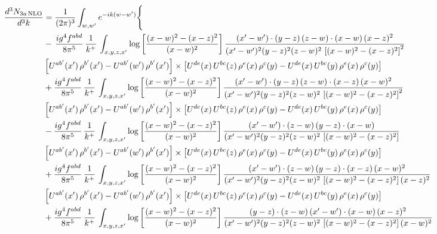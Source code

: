 \documentclass[9pt]{article}
\numberwithin{equation}{section}
\begin{document}
\begin{align}
\frac{d^{3}N_{3a\,\rm NLO}}{d^{3}k} & = \frac{1}{(2\pi)^{3}}\int_{w,w'}e^{-ik(w-w')}\Bigg\{\notag \\
& -\,\frac{ig^{4}f^{abd}}{8\pi^{5}}\,\frac{1}{k^{+}}\,\int_{x,y,z,x'}\log{\left[\frac{(x-w)^{2}-(x-z)^{2}}{(x-w)^{2}}\right]}\,
\frac{(x'-w')\cdot(y-z)\,(z-w)\cdot(x-w)\,(x-z)^{2}}{(x'-w')^{2}(y-z)^{2}(z-w)^{2}\,\left[(x-w)^{2}-(x-z)^{2}\right]^{2}}\notag \\ & \left[U^{ab'}(x')\,\rho^{b'}(x')-U^{ab'}(w')\, \rho^{b'}(x')\right]\times \left[U^{de}(x)\,U^{bc}(z)\, \rho^{e}(x)\,\rho^{c}(y)-U^{de}(x)\,U^{bc}(y)\,\rho^{e}(x)\,\rho^{c}(y)\right] \notag \\
& +\frac{ig^{4}f^{abd}}{8\pi^{5}}\,\frac{1}{k^{+}}\,\int_{x,y,z,x'}\log{\left[\frac{(x-w)^{2}-(x-z)^{2}}{(x-w)^{2}}\right]}\,
\frac{(x'-w')\cdot(y-z)\,(z-w)\cdot(x-z)\,(x-w)^{2}}{(x'-w')^{2}(y-z)^{2}(z-w)^{2}\,\left[(x-w)^{2}-(x-z)^{2}\right]^{2}}\notag \\ 
&\left[U^{ab'}(x')\,\rho^{b'}(x')-U^{ab'}(w')\, \rho^{b'}(x')\right]\times \left[U^{de}(x)\,U^{bc}(z)\, \rho^{e}(x)\,\rho^{c}(y)-U^{de}(x)\,U^{bc}(y)\,\rho^{e}(x)\,\rho^{c}(y)\right] \notag \\
& -\frac{ig^{4}f^{abd}}{8\pi^{5}}\,\frac{1}{k^{+}}\,\int_{x,y,z,x'}\log{\left[\frac{(x-w)^{2}-(x-z)^{2}}{(x-w)^{2}}\right]}\,
\frac{(x'-w')\cdot(z-w)\,(y-z)\cdot(x-w)}{(x'-w')^{2}(y-z)^{2}(z-w)^{2}\,\left[(x-w)^{2}-(x-z)^{2}\right]}\notag \\ & \left[U^{ab'}(x')\,\rho^{b'}(x')-U^{ab'}(w')\, \rho^{b'}(x')\right]\times \left[U^{de}(x)\,U^{bc}(z)\, \rho^{e}(x)\,\rho^{c}(y)-U^{de}(x)\,U^{bc}(y)\,\rho^{e}(x)\,\rho^{c}(y)\right] \notag \\
&  +\frac{ig^{4}f^{abd}}{8\pi^{5}}\,\frac{1}{k^{+}}\,\int_{x,y,z,x'}\log{\left[\frac{(x-w)^{2}-(x-z)^{2}}{(x-w)^{2}}\right]}\,
\frac{(x'-w')\cdot(z-w)\,(y-z)\cdot(x-z)\,(x-w)^{2}}{(x'-w')^{2}(y-z)^{2}(z-w)^{2}\,\left[(x-w)^{2}-(x-z)^{2}\right](x-z)^{2}}\notag \\ & \left[U^{ab'}(x')\,\rho^{b'}(x')-U^{ab'}(w')\, \rho^{b'}(x')\right]\times \left[U^{de}(x)\,U^{bc}(z)\, \rho^{e}(x)\,\rho^{c}(y)-U^{de}(x)\,U^{bc}(y)\,\rho^{e}(x)\,\rho^{c}(y)\right] \notag \\
& +\frac{ig^{4}f^{abd}}{8\pi^{5}}\,\frac{1}{k^{+}}\,\int_{x,y,z,x'}\log{\left[\frac{(x-w)^{2}-(x-z)^{2}}{(x-w)^{2}}\right]}\,
\frac{(y-z)\cdot(z-w)\,(x'-w')\cdot(x-w)\,(x-z)^{2}}{(x'-w')^{2}(y-z)^{2}(z-w)^{2}\,\left[(x-w)^{2}-(x-z)^{2}\right](x-w)^{2}}\notag \\ 

\end{align}
\end{document}
